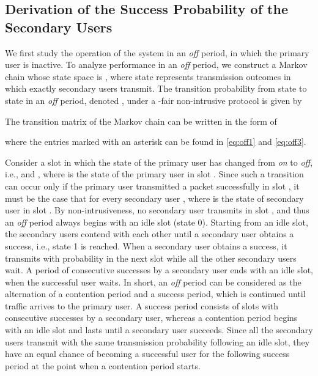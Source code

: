 \documentclass[12pt,draftclsnofoot,onecolumn]{IEEEtran}
\begin{document}
\subsection{Derivation of the Success Probability of the Secondary Users}

We first study the operation of the system in an
\emph{off} period, in which the primary user is inactive.
To analyze performance in an \emph{off} period,
we construct a Markov chain whose state space is , where state  represents
transmission outcomes in which exactly  secondary users transmit.
The transition probability from state  to state  in an \emph{off} period,
denoted , under a -fair non-intrusive protocol is given by

The transition matrix of the Markov chain can be written in the form of

where the entries marked with an asterisk can be found in \eqref{eq:off1} and \eqref{eq:off3}.

Consider a slot  in which the state of the primary user has changed from \emph{on} to \emph{off},
i.e.,  and , where  is the state of the primary
user in slot .
Since such a transition can occur
only if the primary user transmitted a packet successfully in slot , it must be the case that
 for every secondary user ,
where  is the state of secondary user  in slot .
By non-intrusiveness, no secondary user transmits in slot , and thus an \emph{off} period
always begins with an idle slot (state 0).
Starting from an idle slot, the secondary users contend with each other
until a secondary user obtains a success, i.e., state 1 is reached. When a secondary
user obtains a success, it transmits with probability  in the next slot
while all the other secondary users wait. A period of consecutive successes by a secondary user
ends with an idle slot, when the successful user waits. In short, an \emph{off} period can be considered as
the alternation of a contention period and a success period, which is continued until
traffic arrives to the primary user. A success period consists of
slots with consecutive successes by a secondary user, whereas a contention period
begins with an idle slot and lasts until a secondary user succeeds. Since all the secondary users transmit
with the same transmission probability following an idle slot, they have an equal
chance of becoming a successful user for the following success period at the point when a contention period starts.
\end{document}
